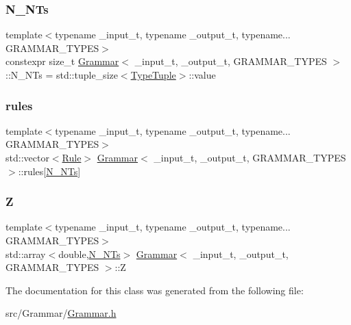 \mbox{\label{class_grammar_a845af53585cb7b104458b4f4b6da114f}} 
\subsubsection{\texorpdfstring{N\+\_\+\+N\+Ts}{N\_NTs}}
{\footnotesize\ttfamily template$<$typename \+\_\+input\+\_\+t, typename \+\_\+output\+\_\+t, typename... G\+R\+A\+M\+M\+A\+R\+\_\+\+T\+Y\+P\+ES$>$ \\
constexpr size\+\_\+t \hyperlink{class_grammar}{Grammar}$<$ \+\_\+input\+\_\+t, \+\_\+output\+\_\+t, G\+R\+A\+M\+M\+A\+R\+\_\+\+T\+Y\+P\+ES $>$\+::N\+\_\+\+N\+Ts = std\+::tuple\+\_\+size$<$\hyperlink{class_grammar_abfb390f3654ce837c97c8b3d0d3b5f0f}{Type\+Tuple}$>$\+::value\hspace{0.3cm}{\ttfamily [static]}}

\mbox{\label{class_grammar_a06752487e61dd790df43b530044702fd}} 
\subsubsection{\texorpdfstring{rules}{rules}}
{\footnotesize\ttfamily template$<$typename \+\_\+input\+\_\+t, typename \+\_\+output\+\_\+t, typename... G\+R\+A\+M\+M\+A\+R\+\_\+\+T\+Y\+P\+ES$>$ \\
std\+::vector$<$\hyperlink{class_rule}{Rule}$>$ \hyperlink{class_grammar}{Grammar}$<$ \+\_\+input\+\_\+t, \+\_\+output\+\_\+t, G\+R\+A\+M\+M\+A\+R\+\_\+\+T\+Y\+P\+ES $>$\+::rules\mbox{[}\hyperlink{class_grammar_a845af53585cb7b104458b4f4b6da114f}{N\+\_\+\+N\+Ts}\mbox{]}}

\mbox{\label{class_grammar_a7cf38380ce1e0ea85706673859693d71}} 
\subsubsection{\texorpdfstring{Z}{Z}}
{\footnotesize\ttfamily template$<$typename \+\_\+input\+\_\+t, typename \+\_\+output\+\_\+t, typename... G\+R\+A\+M\+M\+A\+R\+\_\+\+T\+Y\+P\+ES$>$ \\
std\+::array$<$double,\hyperlink{class_grammar_a845af53585cb7b104458b4f4b6da114f}{N\+\_\+\+N\+Ts}$>$ \hyperlink{class_grammar}{Grammar}$<$ \+\_\+input\+\_\+t, \+\_\+output\+\_\+t, G\+R\+A\+M\+M\+A\+R\+\_\+\+T\+Y\+P\+ES $>$\+::Z}



The documentation for this class was generated from the following file\+:\begin{DoxyCompactItemize}
\item 
src/\+Grammar/\hyperlink{_grammar_8h}{Grammar.\+h}\end{DoxyCompactItemize}
